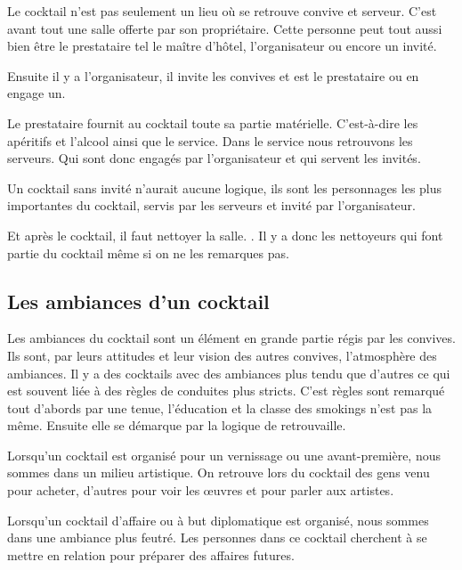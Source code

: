 Le cocktail n’est pas seulement un lieu où se retrouve convive et serveur. C’est avant tout une salle offerte par son propriétaire. Cette personne peut tout aussi bien être le prestataire tel le maître d’hôtel, l’organisateur ou encore un invité.

Ensuite il y a l’organisateur, il invite les convives et est le prestataire ou en engage un.

Le prestataire fournit au cocktail toute sa partie matérielle. C’est-à-dire les apéritifs et l’alcool ainsi que le service. Dans le service nous retrouvons les serveurs. Qui sont donc engagés par l’organisateur et qui servent les invités.

Un cocktail sans invité n’aurait aucune logique, ils sont les personnages les plus importantes du cocktail, servis par les serveurs et invité par l’organisateur.

Et après le cocktail, il faut nettoyer la salle. . Il y a donc les nettoyeurs qui font partie du cocktail même si on ne les remarques pas.

\subsection{Les ambiances d'un cocktail}




Les ambiances du cocktail sont un élément en grande partie régis par les convives. Ils sont, par leurs attitudes et leur vision des autres convives, l’atmosphère des ambiances. 
Il y a des cocktails avec des ambiances plus tendu que d’autres ce qui est souvent liée à des règles de conduites plus stricts. C’est règles sont remarqué tout d’abords par une tenue, l’éducation et la classe des smokings n’est pas la même.  Ensuite elle se démarque par la logique de retrouvaille. 

Lorsqu’un cocktail est organisé pour un vernissage ou une avant-première, nous sommes dans un milieu artistique. On retrouve lors du cocktail des gens venu pour acheter, d’autres pour voir les œuvres et pour parler aux artistes.

Lorsqu’un cocktail d’affaire ou à but diplomatique est organisé, nous sommes dans une ambiance plus feutré.  Les personnes dans ce cocktail cherchent à se mettre en relation pour préparer des affaires futures.

